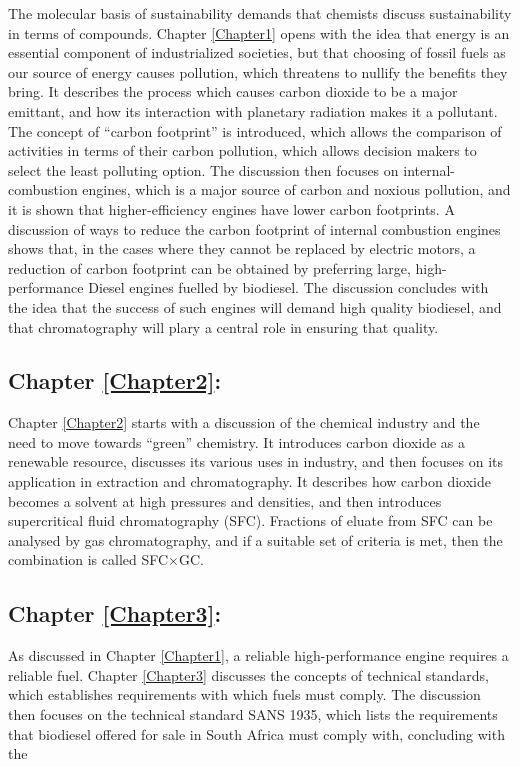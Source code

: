 The molecular basis of sustainability \autocite{Anastas2016} demands that
chemists discuss sustainability in terms of compounds. Chapter \ref{Chapter1}
opens with the idea that energy is an essential component of industrialized
societies, but that choosing of fossil fuels as our source of energy causes
pollution, which threatens to nullify the benefits they bring. It describes the
process which causes carbon dioxide to be a major emittant, and how its
interaction with planetary radiation makes it a pollutant. The concept of
``carbon footprint'' is introduced, which allows the comparison of activities in
terms of their carbon pollution, which allows decision makers to select the
least polluting option. The discussion then focuses on internal-combustion
engines, which is a major source of carbon and noxious pollution, and it is
shown that higher-efficiency engines have lower carbon footprints. A discussion
of ways to reduce the carbon footprint of internal combustion engines shows
that, in the cases where they cannot be replaced by electric motors, a reduction
of carbon footprint can be obtained by preferring large, high-performance Diesel
engines fuelled by biodiesel. The discussion concludes with the idea that the
success of such engines will demand high quality biodiesel, and that
chromatography will plary a central role in ensuring that quality.

\subsection{Chapter \ref{Chapter2}:  }

Chapter \ref{Chapter2} starts with a discussion of the chemical industry and the
need to move towards ``green'' chemistry. It introduces carbon dioxide as a
renewable resource, discusses its various uses in industry, and then focuses on
its application in extraction and chromatography. It describes how carbon
dioxide becomes a solvent at high pressures and densities, and then introduces
supercritical fluid chromatography (SFC). Fractions of eluate from SFC can be
analysed by gas chromatography, and if a suitable set of criteria is met, then
the combination is called SFC×GC.

\subsection{Chapter \ref{Chapter3}:  }

As discussed in Chapter \ref{Chapter1}, a reliable high-performance engine
requires a reliable fuel. Chapter \ref{Chapter3} discusses the concepts of
technical standards, which establishes requirements with which fuels must
comply. The discussion then focuses on the technical standard SANS 1935, which
lists the requirements that biodiesel offered for sale in South Africa must
comply with, concluding with the 

